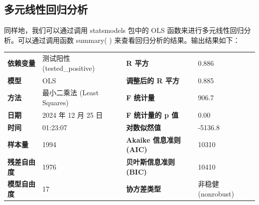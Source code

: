 \documentclass[UTF8,ctexart,a4paper,11pt,openany]{article}
\theoremstyle{definition}
\begin{document}
    \subsection{多元线性回归分析}
    同样地，我们可以通过调用 statsmodels 包中的 OLS 函数来进行多元线性回归分析。可以通过调用函数 summary( ) 来查看回归分析的结果。输出结果如下：
    \par
    \begin{tabular}{|l l l l|}
        \hline
        \textbf{依赖变量} & 测试阳性 (tested\_positive) & \textbf{R 平方} & 0.886 \\
        \textbf{模型} & OLS & \textbf{调整后的 R 平方} & 0.885 \\
        \textbf{方法} & 最小二乘法 (Least Squares) & \textbf{F 统计量} & 906.7 \\
        \textbf{日期} & 2024 年 12 月 25 日 & \textbf{F 统计量的 p 值} & 0.00 \\
        \textbf{时间} & 01:23:07 & \textbf{对数似然值} & -5136.8 \\
        \textbf{样本量} & 1994 & \textbf{Akaike 信息准则 (AIC)} & 10310 \\
        \textbf{残差自由度} & 1976 & \textbf{贝叶斯信息准则 (BIC)} & 10410 \\
        \textbf{模型自由度} & 17 & \textbf{协方差类型} & 非稳健 (nonrobust) \\
        \hline
        \end{tabular}
    \par   
\end{document}
